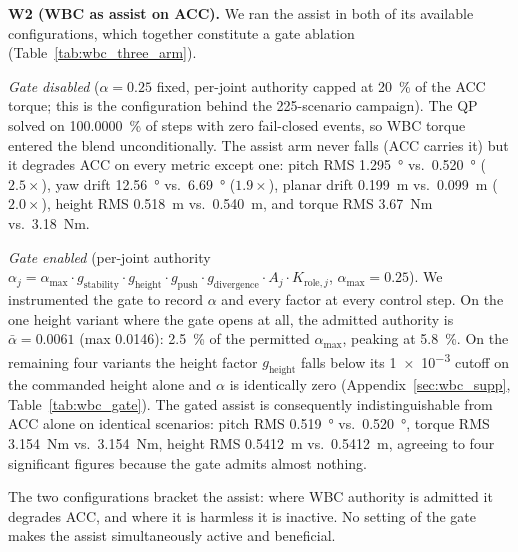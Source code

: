 \documentclass[a4paper,fleqn]{cas-dc}
\begin{document}
\medskip\noindent\textbf{W2 (WBC as assist on ACC).}
We ran the assist in both of its available configurations, which together constitute a gate ablation (Table~\ref{tab:wbc_three_arm}).

\emph{Gate disabled} ($\alpha{=}0.25$ fixed, per-joint authority capped at \SI{20}{\percent} of the ACC torque; this is the configuration behind the 225-scenario campaign). The QP solved on \SI{100.0000}{\percent} of steps with zero fail-closed events, so WBC torque entered the blend unconditionally. The assist arm never falls (ACC carries it) but it degrades ACC on every metric except one: pitch RMS \SI{1.295}{\degree} vs.\ \SI{0.520}{\degree} ($\num{2.5}\times$), yaw drift \SI{12.56}{\degree} vs.\ \SI{6.69}{\degree} ($\num{1.9}\times$), planar drift \SI{0.199}{m} vs.\ \SI{0.099}{m} ($\num{2.0}\times$), height RMS \SI{0.518}{m} vs.\ \SI{0.540}{m}, and torque RMS \SI{3.67}{Nm} vs.\ \SI{3.18}{Nm}.

\emph{Gate enabled} (per-joint authority $\alpha_{j} = \alpha_{\max}\!\cdot\!g_{\text{stability}}\!\cdot\!g_{\text{height}}\!\cdot\!g_{\text{push}}\!\cdot\!g_{\text{divergence}}\!\cdot\!A_j\!\cdot\!K_{\text{role},j}$, $\alpha_{\max}{=}0.25$). We instrumented the gate to record $\alpha$ and every factor at every control step. On the one height variant where the gate opens at all, the admitted authority is $\bar\alpha{=}\num{0.0061}$ (max \num{0.0146}): \SI{2.5}{\percent} of the permitted $\alpha_{\max}$, peaking at \SI{5.8}{\percent}. On the remaining four variants the height factor $g_{\text{height}}$ falls below its \num{1e-3} cutoff on the commanded height alone and $\alpha$ is identically zero (Appendix~\ref{sec:wbc_supp}, Table~\ref{tab:wbc_gate}). The gated assist is consequently indistinguishable from ACC alone on identical scenarios: pitch RMS \SI{0.519}{\degree} vs.\ \SI{0.520}{\degree}, torque RMS \SI{3.154}{Nm} vs.\ \SI{3.154}{Nm}, height RMS \SI{0.5412}{m} vs.\ \SI{0.5412}{m}, agreeing to four significant figures because the gate admits almost nothing.

The two configurations bracket the assist: where WBC authority is admitted it degrades ACC, and where it is harmless it is inactive. No setting of the gate makes the assist simultaneously active and beneficial.
\end{document}
